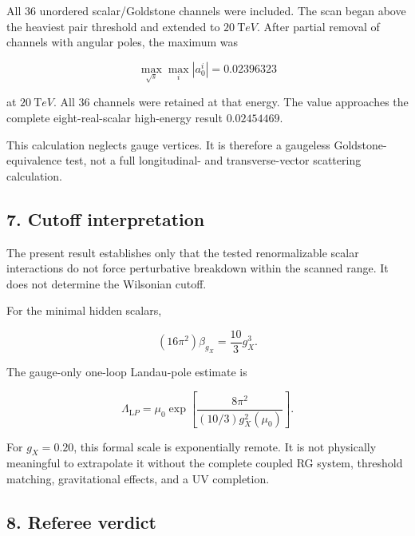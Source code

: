 \documentclass[
]{article}
\begin{document}
All 36 unordered scalar/Goldstone channels were included. The scan began
above the heaviest pair threshold and extended to \(20\ {\mathrm TeV}\).
After partial removal of channels with angular poles, the maximum was

\[
\max_{\sqrt{s}}\max_i|a_0^i|
=0.02396323
\]

at \(20\ {\mathrm TeV}\). All 36 channels were retained at that energy.
The value approaches the complete eight-real-scalar high-energy result
\(0.02454469\).

This calculation neglects gauge vertices. It is therefore a gaugeless
Goldstone-equivalence test, not a full longitudinal- and
transverse-vector scattering calculation.

\hypertarget{cutoff-interpretation}{%
\subsection{7. Cutoff interpretation}\label{cutoff-interpretation}}

The present result establishes only that the tested renormalizable
scalar interactions do not force perturbative breakdown within the
scanned range. It does not determine the Wilsonian cutoff.

For the minimal hidden scalars,

\[
(16\pi^2)\beta_{g_X}=\frac{10}{3}g_X^3.
\]

The gauge-only one-loop Landau-pole estimate is

\[
\Lambda_{\mathrm LP}
=\mu_0\exp\!\left[\frac{8\pi^2}{(10/3)g_X^2(\mu_0)}\right].
\]

For \(g_X=0.20\), this formal scale is exponentially remote. It is not
physically meaningful to extrapolate it without the complete coupled RG
system, threshold matching, gravitational effects, and a UV completion.

\hypertarget{referee-verdict}{%
\subsection{8. Referee verdict}\label{referee-verdict}}
\end{document}
